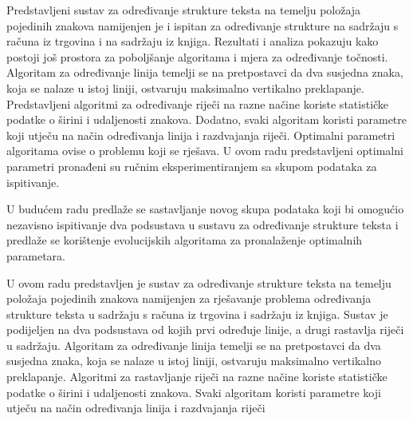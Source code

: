 \documentclass[times, utf8, zavrsni]{fer}
\begin{document}
Predstavljeni sustav za određivanje strukture teksta na temelju položaja
pojedinih znakova namijenjen je i ispitan za određivanje strukture na sadržaju
s računa iz trgovina i na sadržaju iz knjiga. Rezultati i analiza pokazuju kako
postoji još prostora za poboljšanje algoritama i mjera za određivanje
točnosti. Algoritam za određivanje linija temelji se na pretpostavci da dva
susjedna znaka, koja se nalaze u istoj liniji, ostvaruju maksimalno vertikalno
preklapanje. Predstavljeni algoritmi za određivanje riječi na razne načine
koriste statističke podatke o širini i udaljenosti znakova. Dodatno,
svaki algoritam koristi parametre koji utječu na način određivanja linija i
razdvajanja riječi. Optimalni parametri algoritama ovise o problemu koji se
rješava. U ovom radu predstavljeni optimalni parametri pronađeni su ručnim
eksperimentiranjem sa skupom podataka za ispitivanje.

U budućem radu predlaže se sastavljanje novog skupa podataka koji bi omogućio
nezavisno ispitivanje dva podsustava u sustavu za određivanje strukture teksta i
predlaže se korištenje evolucijskih algoritama za pronalaženje optimalnih
parametara.




\begin{sazetak}
U ovom radu predstavljen je sustav za određivanje strukture teksta na temelju
položaja pojedinih znakova namijenjen za rješavanje problema određivanja
strukture teksta u sadržaju s računa iz trgovina i sadržaju iz knjiga. Sustav je
podijeljen na dva podsustava od kojih prvi određuje linije, a drugi rastavlja
riječi u sadržaju. Algoritam za određivanje linija temelji se na pretpostavci
da dva susjedna znaka, koja se nalaze u istoj liniji, ostvaruju maksimalno
vertikalno preklapanje. Algoritmi za rastavljanje riječi na razne načine
koriste statističke podatke o širini i udaljenosti znakova. Svaki algoritam
koristi parametre koji utječu na način određivanja linija i razdvajanja riječi


\end{sazetak}
\end{document}
